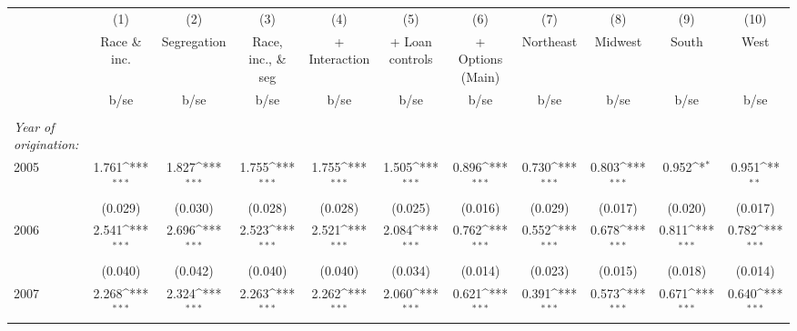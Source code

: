{
\def\sym#1{\ifmmode^{#1}\else\(^{#1}\)\fi}
\begin{tabular}{l*{10}{c}}
\hline\hline
                    &\multicolumn{1}{c}{(1)}         &\multicolumn{1}{c}{(2)}         &\multicolumn{1}{c}{(3)}         &\multicolumn{1}{c}{(4)}         &\multicolumn{1}{c}{(5)}         &\multicolumn{1}{c}{(6)}         &\multicolumn{1}{c}{(7)}         &\multicolumn{1}{c}{(8)}         &\multicolumn{1}{c}{(9)}         &\multicolumn{1}{c}{(10)}         \\
                    &Race \& inc.         & Segregation         &Race, inc., \& seg         &+ Interaction         &+ Loan controls         &+ Options (Main)         &   Northeast         &     Midwest         &       South         &        West         \\
                    &        b/se         &        b/se         &        b/se         &        b/se         &        b/se         &        b/se         &        b/se         &        b/se         &        b/se         &        b/se         \\
\hline
& & & & & \\ 
 \emph{Year of origination:} & & & & & \\ 
2005                &       1.761\sym{***}&       1.827\sym{***}&       1.755\sym{***}&       1.755\sym{***}&       1.505\sym{***}&       0.896\sym{***}&       0.730\sym{***}&       0.803\sym{***}&       0.952\sym{*}  &       0.951\sym{**} \\
                    &     (0.029)         &     (0.030)         &     (0.028)         &     (0.028)         &     (0.025)         &     (0.016)         &     (0.029)         &     (0.017)         &     (0.020)         &     (0.017)         \\
2006                &       2.541\sym{***}&       2.696\sym{***}&       2.523\sym{***}&       2.521\sym{***}&       2.084\sym{***}&       0.762\sym{***}&       0.552\sym{***}&       0.678\sym{***}&       0.811\sym{***}&       0.782\sym{***}\\
                    &     (0.040)         &     (0.042)         &     (0.040)         &     (0.040)         &     (0.034)         &     (0.014)         &     (0.023)         &     (0.015)         &     (0.018)         &     (0.014)         \\
2007                &       2.268\sym{***}&       2.324\sym{***}&       2.263\sym{***}&       2.262\sym{***}&       2.060\sym{***}&       0.621\sym{***}&       0.391\sym{***}&       0.573\sym{***}&       0.671\sym{***}&       0.640\sym{***}\\

\end{tabular}}
